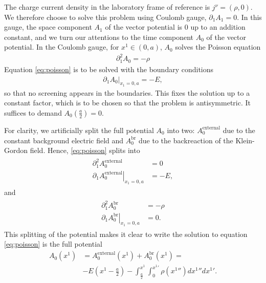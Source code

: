 The charge current density in the laboratory frame of reference is $j^{\nu}=(\rho, 0)$.
We therefore choose to  solve this problem using Coulomb gauge, $\partial_1 A_1 = 0$. In this gauge, the space component $A_1$ of the vector potential is 0 up to an addition constant, and 
we turn our attentions to the time component $A_0$ of the vector potential. In the Coulomb gauge, for $x^{1}\in (0, a)$, $A_0$ solves the Poisson equation
\begin{align}
	 \partial_1^2 A_0 = -\rho 
	 \label{eq:poisson}
\end{align}
Equation \eqref{eq:poisson}  is to be solved with the boundary conditions
\begin{align}
 	  \left.\partial_1 A_0 \right|_{x_1=0, a}=-E,
		  \label{eq:boundary-conditions-A0}
\end{align}
so that no screening appears in the boundaries. This fixes the solution up to a constant factor, which is to be chosen so that the problem is antisymmetric. It suffices to demand $A_0(\frac{a}{2}) = 0$.

For clarity, we artificially split the full potential $A_0$ into two: $A_0^\text{external}$ due to the constant background electric field and $A_0^{\text{br}}$ due to the backreaction of the Klein-Gordon field.
Hence, \eqref{eq:poisson} splits into  
\begin{align}
	\begin{split}
		\partial_1^2A_0^{\text{external}}&= 0 \\
		\left.\partial_1 A_0^{\text{external}} \right|_{x_1=0, a}&=-E,
	\end{split}
			\label{eq:poisson-external}
		\end{align}
	and
\begin{align}
	\begin{split}
		\partial_1^2A_0^{\text{br}}&= -\rho \\
		\left.\partial_1 A_0^{\text{br}} \right|_{x_1=0, a}&=0.
	\end{split}
			\label{eq:poisson-br}
		\end{align}
This splitting of the potential makes it clear to write the solution to equation \eqref{eq:poisson} is the full potential
		\begin{align}
			A_0(x^{1}) &=
			A_0^{\text{external}}(x^{1}) +
			A_0^{\text{br}}(x^{1}) =  \\
				   &-E\left( x^{1}-\frac{a}{2} \right) - \int_{\frac{a}{2}}^{x^{1}}\int_{0}^{x^{1}'}     \rho(x^{1}'') dx^{1}'' dx^{1}' .
		\end{align}


